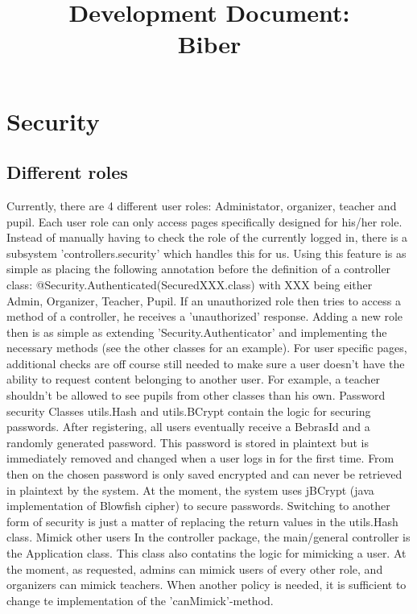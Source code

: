 \documentclass[11pt,a4paper]{article}
\title{Development Document:\\ Biber}
\begin{document}
\maketitle
\parindent 0pt
\tableofcontents
\newpage

\section{Security}
\subsection{Different roles}
Currently, there are 4 different user roles: Administator, organizer, teacher and pupil. Each user role can only access pages specifically designed for his/her role. Instead of manually having to check the role of the currently logged in, there is a subsystem 'controllers.security' which handles this for us. Using this feature is as simple as placing the following annotation before the definition of a controller class: @Security.Authenticated(SecuredXXX.class) with XXX being either Admin, Organizer, Teacher, Pupil.  If an unauthorized role then tries to access a method of a controller, he receives a 'unauthorized' response.
Adding a new role then is as simple as extending 'Security.Authenticator' and implementing the necessary methods (see the other classes for an example). 
For user specific pages, additional checks are off course still needed to make sure a user doesn't have the ability to request content belonging to another user. For example, a teacher shouldn't be allowed to see pupils from other classes than his own. 
Password security
Classes utils.Hash and utils.BCrypt contain the logic for securing passwords.
After registering, all users eventually receive a BebrasId and a randomly generated password. This password is stored in plaintext but is immediately removed and changed when a user logs in for the first time. From then on the chosen password is only saved encrypted and can never be retrieved in plaintext by the system.
At the moment, the system uses jBCrypt (java implementation of Blowfish cipher) to secure passwords. Switching to another form of security is just a matter of replacing the return values in the utils.Hash class.
Mimick other users
In the controller package, the main/general controller is the Application class. This class also contatins the logic for mimicking a user. At the moment, as requested, admins can mimick users of every other role, and organizers can mimick teachers. When another policy is needed, it is sufficient to change te implementation of the 'canMimick'-method. 
\end{document}
